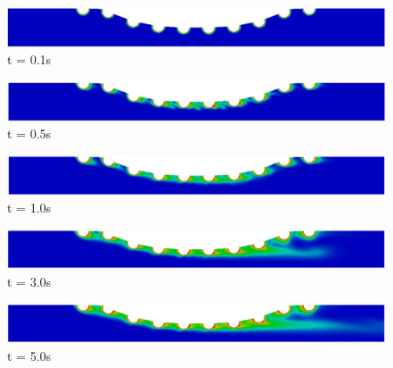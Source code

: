 \begin{figure}[H]
     \begin{minipage}{.50\linewidth}
      \centering
      \includegraphics[scale=0.18]{./02_chaps/cap_solution/figure/conc10_CurvedStrut1.png}\\
      t = 0.1s
     \end{minipage}%
     \begin{minipage}{.50\linewidth}
      \centering
      \includegraphics[scale=0.18]{./02_chaps/cap_solution/figure/conc10_CurvedStrut2.png}\\
      t = 0.5s
     \end{minipage}
     \begin{minipage}{.50\linewidth}
     \medskip
      \centering
      \includegraphics[scale=0.18]{./02_chaps/cap_solution/figure/conc10_CurvedStrut3.png}\\
      t = 1.0s
     \end{minipage}%
     \begin{minipage}{.50\linewidth}
     \medskip
      \centering
      \includegraphics[scale=0.18]{./02_chaps/cap_solution/figure/conc10_CurvedStrut4.png}\\
      t = 3.0s
     \end{minipage}
     \begin{minipage}{.50\linewidth}
      \centering
      \includegraphics[scale=0.18]{./02_chaps/cap_solution/figure/conc10_CurvedStrut5.png}\\
      t = 5.0s
     \end{minipage}%

\end{figure}
